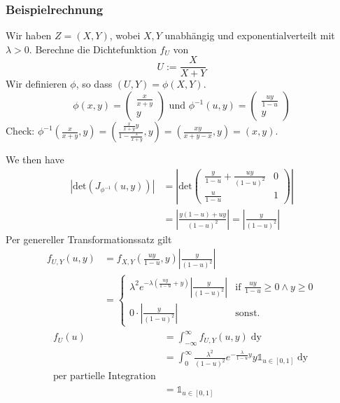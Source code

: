 \subsubsection*{Beispielrechnung}
Wir haben $Z = (X, Y)$, wobei $X, Y$ unabhängig und exponentialverteilt mit $\lambda > 0$. Berechne die Dichtefunktion $f_U$ von $$U:= \frac{X}{X+Y}$$
Wir definieren $\phi$, so dass $(U, Y) = \phi(X, Y)$.
\[\phi(x, y) = \left(\begin{matrix}
    \frac{x}{x+y}\\
    y
\end{matrix}\right) \text{ und } \phi^{-1}(u, y) = \left(\begin{matrix}
    \frac{uy}{1-u}\\
    y
\end{matrix}\right)\]
Check: $\phi^{-1}\left(\frac{x}{x+y}, y\right) = \left(\frac{\frac{x}{x+y}y}{1-\frac{x}{x+y}}, y\right) = \left(\frac{xy}{x+y-x}, y\right) = \left(x, y\right).$ 

We then have 
\begin{align*}
    \left|\text{det}\left(J_{\phi^{-1}}(u,y)\right)\right| &= \left\vert\text{det}\left(\begin{matrix}
        \frac{y}{1-u}+\frac{uy}{(1-u)^2} & 0\\
        \frac{u}{1-u} & 1
    \end{matrix}\right) \right\vert\\
    &= \left|\frac{y(1-u)+uy}{(1-u)^2}\right| = \left|\frac{y}{(1-u)^2}\right|
\end{align*}
Per genereller Transformationssatz gilt
\begin{align*}
    f_{U,Y}(u,y) &= f_{X, Y}\left(\frac{uy}{1-u}, y\right)\left\vert\frac{y}{(1-u)^2}\right\vert\\
                &= \begin{cases}
                    \lambda^2 e^{-\lambda\left(\frac{uy}{1-u}+y\right)}\left\vert\frac{y}{(1-u)^2}\right\vert &\text{if } \frac{uy}{1-u} \geq 0 \land y \geq 0\\
                    0 \cdot \left\vert\frac{y}{(1-u)^2}\right\vert & \text{sonst.}
                \end{cases}
\end{align*}
\begin{align*}
    f_U(u) &= \int_{-\infty}^\infty f_{U,Y}(u,y) \mathop{dy}\\
            &= \int_{0}^\infty \frac{\lambda^2}{(1-u)^2}e^{-\frac{\lambda}{1-u}y}y \mathds{1}_{u\in[0,1]}\mathop{dy}\\
            \text{per partielle Integration}\\
            &= \mathds{1}_{u \in [0,1]}
\end{align*}